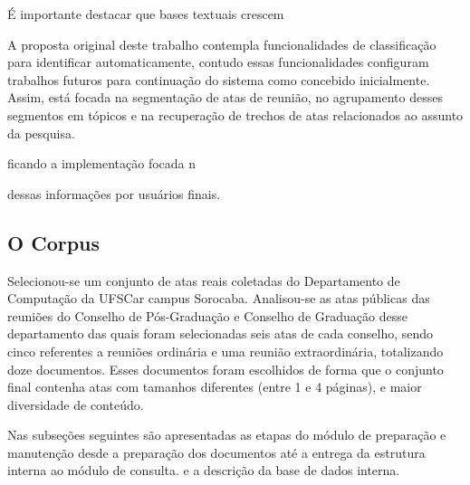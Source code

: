 É importante destacar que bases textuais crescem 



A proposta original deste trabalho contempla funcionalidades de classificação para identificar automaticamente, contudo essas funcionalidades configuram trabalhos futuros para continuação do sistema como concebido inicialmente. Assim, está focada na segmentação de atas de reunião, no agrupamento desses segmentos em tópicos e na recuperação de trechos de atas relacionados ao assunto da pesquisa.



ficando a implementação focada n

dessas informações por usuários finais.







\subsection{O Corpus}


Selecionou-se um conjunto de atas reais coletadas do Departamento de Computação da UFSCar campus Sorocaba. Analisou-se as atas públicas das reuniões do Conselho de Pós-Graduação e Conselho de Graduação desse departamento das quais foram selecionadas seis atas de cada conselho, sendo cinco referentes a reuniões ordinária e uma reunião extraordinária, totalizando doze documentos. Esses documentos foram escolhidos de forma que o conjunto final contenha atas com tamanhos diferentes (entre 1 e 4 páginas), e maior diversidade de conteúdo.






Nas subseções seguintes são apresentadas as etapas do módulo de preparação e manutenção desde a preparação dos documentos até a entrega da estrutura interna ao módulo de consulta. 
e a descrição da base de dados interna.
















